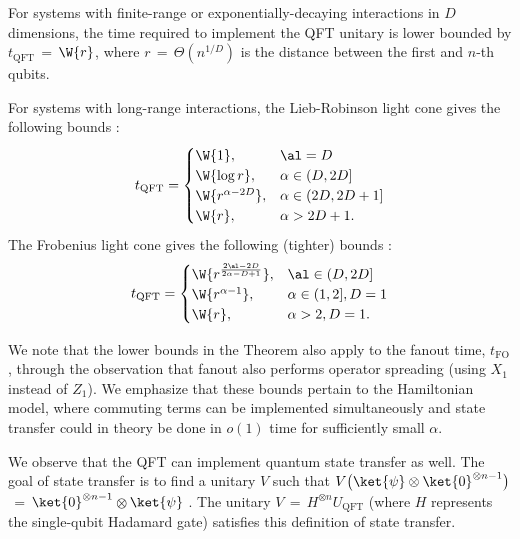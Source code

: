 %
\begin{theorem*}  \label{thm:QFTlowerbounds}
  For systems with finite-range or exponentially-decaying interactions in $D$ dimensions, the time required to implement the QFT unitary is lower bounded by $t_\mathrm{QFT}$\,$= $\,$\W{r}$, where $r$\,$=$\,$\Theta(n^{1/D})$ is the distance between the first and $n$-th qubits.

  For systems with long-range interactions, the Lieb-Robinson light cone gives the following bounds \cite{kuwaharaStrictlyLinearLight2020,Tran2019,Hastings2006,Tran2021b}:
  \begin{align}
  \label{eq:LRlowerbounds}
   t_\mathrm{QFT} =
   \begin{cases}
      \W{1}, & \al = D
      \\ \W{\log r}, & \alpha \in (D,2D]
      \\ \W{r^{\alpha-2D}}, & \alpha \in (2D,2D+1]
      \\ \W{r}, & \alpha > 2D + 1.
    \end{cases}
  \end{align}
  The Frobenius light cone gives the following (tighter) bounds \cite{Kuwahara2021,Chen2021}:
  \begin{align}
  \label{eq:Froblowerbounds}
   t_\mathrm{QFT} =
   \begin{cases}
      \W{r^{\frac{2\al-2D}{2\alpha-D+1}}}, & \al \in (D,2D]
      \\ \W{r^{\alpha -1}}, & \alpha \in (1,2], D=1
      \\ \W{r}, & \alpha > 2, D=1.
   \end{cases}
  \end{align}
\end{theorem*}
%
We note that the lower bounds in the Theorem also apply to the fanout time, $t_\mathrm{FO}$, through the observation that fanout also performs operator spreading (using $X_1$ instead of $Z_1$).
We emphasize that these bounds pertain to the Hamiltonian model, where commuting terms can be implemented simultaneously and state transfer could in theory be done in $o(1)$ time for sufficiently small $\alpha$.

We observe that the QFT can implement quantum state transfer as well.
The goal of state transfer is to find a unitary $V$ such that
$V \bigl(\ket{\psi} \otimes \ket{0}^{\otimes n-1}\bigr)$\,$=$\,$\ket{0}^{\otimes n-1}$\,$\otimes $\,$\ket{\psi}$ \cite{Eldredge2017,Epstein2017}.
The unitary $V$\,$=$\,$H^{\otimes n} U_\mathrm{QFT}$ (where $H$ represents the single-qubit Hadamard gate) satisfies this definition of state transfer.

